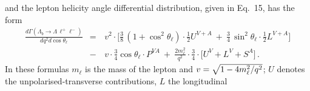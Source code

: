 and the lepton helicity angle differential distribution, given in Eq.~15, has the form
\begin{eqnarray}
\label{costheta2}
\frac{d\Gamma(\Lambda_{b}\to \Lambda \,\ell^{+}\ell^{-})}{dq^2d\cos\theta_\ell} 
&=&\,
v^{2}\cdot\bigg[\frac{3}{8}\,(1+\cos^2\theta_\ell)\cdot
\frac{1}{2} U^{V+A}  
\ + \ \frac{3}{4}\,\sin^2\theta_\ell\cdot
\frac{1}{2} L^{V+A} \bigg]\label{distr2}\nonumber\\[2mm]
&-&\,v \cdot\frac{3}{4}\cos\theta_\ell\cdot P^{VA} 
\ + \ \frac{2m_{\ell}^{2}}{q^{2}}\cdot \frac{3}{4}\cdot
\bigg[ U^{V}+ L^{V} + S^{A} \bigg]\,.
\end{eqnarray}
%
In these formulas $m_\ell$ is the mass of the lepton and $v = \sqrt{1-4m_\ell^2/q^2}$; $U$ denotes
the unpolarised-transverse contributions, $L$ the longitudinal
